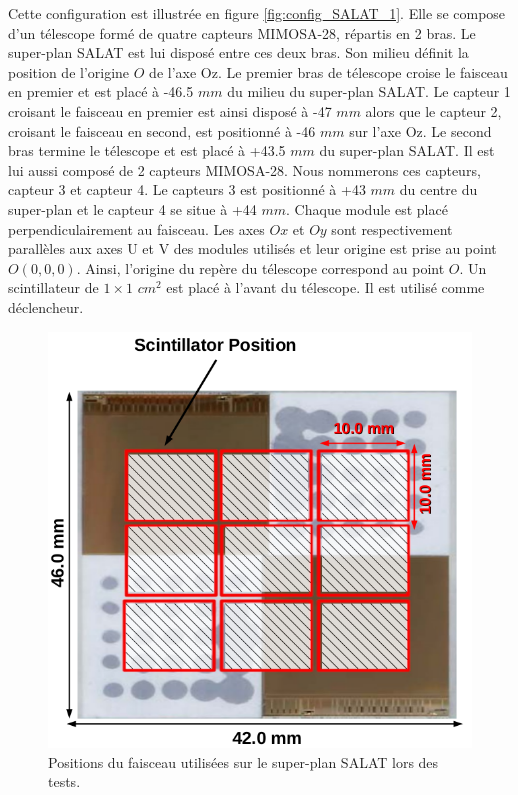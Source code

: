   Cette configuration est illustr\'ee en figure \ref{fig:config_SALAT_1}. Elle se compose d'un t\'elescope form\'e de quatre capteurs MIMOSA-28, r\'epartis en 2 bras. Le super-plan SALAT est lui dispos\'e entre ces deux bras. Son milieu d\'efinit la position de l'origine $O$ de l'axe Oz. Le premier bras  de t\'elescope croise le faisceau en premier et est plac\'e \`a -46.5 $mm$ du milieu du super-plan SALAT. Le capteur 1 croisant le faisceau en premier est ainsi dispos\'e \`a -47 $mm$ alors que le capteur 2, croisant le faisceau en second, est positionn\'e \`a -46 $mm$ sur l'axe Oz. Le second bras termine le t\'elescope et est plac\'e \`a +43.5 $mm$ du super-plan SALAT. Il est lui aussi compos\'e de 2 capteurs MIMOSA-28. Nous nommerons ces capteurs, capteur 3 et capteur 4. Le  capteurs 3 est positionn\'e \`a +43 $mm$ du centre du super-plan et le capteur 4 se situe \`a +44 $mm$. Chaque module est plac\'e perpendiculairement au faisceau. Les axes $Ox$ et $Oy$ sont respectivement parall\`eles aux  axes U et V des modules utilis\'es et leur origine est prise au point $O(0,0,0)$. Ainsi, l'origine du rep\`ere du t\'elescope correspond au point $O$. Un scintillateur de $1 \times 1$ $cm^2$ est plac\'e \`a l'avant du t\'elescope. Il est utilis\'e comme d\'eclencheur.
  
   \begin{figure}[!htb]
    \begin{center} 
      \includegraphics[scale=0.40]{./figures/SALAT_beam_test/beam_positions.png}
      \caption{Positions du faisceau utilis\'ees sur le super-plan SALAT lors des tests.}
      \label{fig:SALAT_zones}
    \end{center}
   \end{figure}

